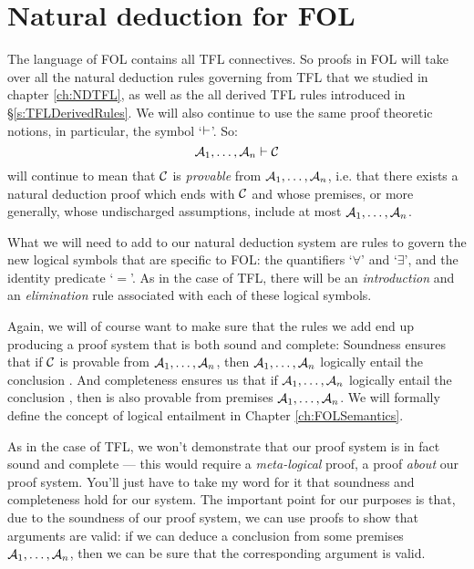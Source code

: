 \chapter{Natural deduction for FOL}\label{ch:NDFOL}

The language of FOL contains all TFL connectives. So proofs in FOL will take over all the natural deduction rules governing from TFL that we studied in chapter \ref{ch:NDTFL}, as well as the all derived  TFL rules introduced in \S \ref{s:TFLDerivedRules}.  We will also continue to use the same proof theoretic notions, in particular, the symbol `$\vdash$'.  So:
$$\mathcal{A}_1, \ldots, \mathcal{A}_n \vdash \mathcal{C}$$
will continue to mean that $\mathcal{C}$ is \emph{provable} from $\mathcal{A}_1, \ldots, \mathcal{A}_n$, i.e. that there exists a natural deduction proof which ends with $\mathcal{C}$ and whose premises, or more generally, whose undischarged assumptions, include at most $\mathcal{A}_1, \ldots, \mathcal{A}_n$.


What we will need to add to our natural deduction system are rules to govern the new logical symbols that are specific to FOL: the quantifiers `$\forall$' and `$\exists$', and the identity predicate `$=$'.  As in the case of TFL, there will be an \emph{introduction} and an \emph{elimination} rule associated with each of these logical symbols.

Again, we will of course want to make sure that the rules we add end up producing a proof system that is both sound and complete: 
Soundness ensures that if $\mathcal{C}$ is provable from $\mathcal{A}_1, \ldots, \mathcal{A}_n$, then $\mathcal{A}_1, \ldots, \mathcal{A}_n$ logically entail the conclusion .  And completeness ensures us that if $\mathcal{A}_1, \ldots, \mathcal{A}_n$ logically entail the conclusion , then  is also provable from premises $\mathcal{A}_1, \ldots, \mathcal{A}_n$.  We will formally define the concept of logical entailment in Chapter \ref{ch:FOLSemantics}.

As in the case of TFL, we won't demonstrate that our proof system is in fact sound and complete --- this would require a \emph{meta-logical} proof, a proof \emph{about} our proof system.  You'll just have to take my word for it that soundness and completeness hold for our system. The important point for our purposes is that, due to the soundness of our proof system, we can use proofs to show that arguments are valid: if we can deduce a conclusion  from some premises $\mathcal{A}_1, \ldots, \mathcal{A}_n$, then we can be sure that the corresponding argument is valid.  

